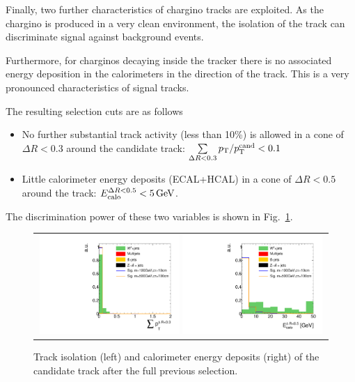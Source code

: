 Finally, two further characteristics of chargino tracks are exploited.
As the chargino is produced in a very clean environment, the isolation of the track can discriminate signal against background events.

Furthermore, for charginos decaying inside the tracker there is no associated energy deposition in the calorimeters in the direction of the track.
This is a very pronounced characteristics of signal tracks.

The resulting selection cuts are as follows
\begin{itemize}
\renewcommand{\labelitemi}{\footnotesize{\ding{118}}}
\item No further substantial track activity (less than 10\%) is allowed in a cone of $\Delta R < 0.3$ around the candidate track: \mbox{$\sum \limits_{\Delta R < 0.3} p_{\text{T}}/p_{\text{T}}^{\text{cand}} < 0.1$}
\item Little calorimeter energy deposits (ECAL+HCAL) in a cone of $\Delta R < 0.5$ around the track: \mbox{$E^{\Delta R<0.5}_{\text{calo}}<5\,\text{Ge}\kern-0.06667em\text{V}$}.
\end{itemize}
The discrimination power of these two variables is shown in Fig.~\ref{fig:TrackIso_Ecalo_After_Preselection}.\\
\begin{figure}[!t]
  \centering 
  \begin{tabular}{c}
    \includegraphics[width=0.49\textwidth]{figures/analysis/AnalysisSelection/chiTracksCandidateSelectionTrigger_2Signals_FullBkg/htrackIsolation_lin.pdf}
    \includegraphics[width=0.49\textwidth]{figures/analysis/AnalysisSelection/chiTracksCandidateSelectionTrigger_2Signals_FullBkg/htrackCaloIsolation_lin.pdf}
  \end{tabular}
  \caption{Track isolation (left) and calorimeter energy deposits (right) of the candidate track after the full previous selection.}
  \label{fig:TrackIso_Ecalo_After_Preselection}
\end{figure}


